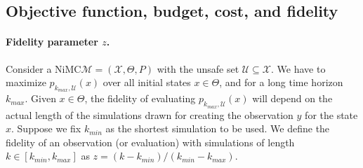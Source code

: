 \documentclass[11pt]{article}
\theoremstyle{definition}
\newcommand{\X}{\mathcal{X}}
\newcommand{\phit}[3]{{p_{#1,#2}{(#3)}}}
\newcommand{\Unsafe}{\mathcal{U}}
\newcommand{\modelname}{NiMC\xspace}
\begin{document}
\subsection{Objective function, budget, cost, and fidelity}
\label{sec:objAndfid}

\paragraph{Fidelity parameter $z$.}
Consider a \modelname $\mathcal{M} = (\X, \Theta, P)$ with the unsafe set $\Unsafe \subseteq \X$. We have to maximize  $\phit{k_{\mathit{max}}}{\Unsafe}{x}$ over all initial states $x \in \Theta$, and for a long time horizon $k_{\mathit{max}}$.
%
Given $x\in \Theta$, the fidelity of evaluating $\phit{k_{\mathit{max}}}{\Unsafe}{x}$  will depend on the actual length of the simulations drawn for creating the observation $y$ for the state $x$.
%
Suppose we fix $k_{\mathit{min}}$ as the shortest  simulation to be used. We define the  fidelity of an observation (or evaluation) with simulations of length $k \in [k_{\mathit{min}}, k_{\mathit{max}} ]$ as $z=(k-k_{min})/(k_{min}-k_{max})$.
%
\end{document}
